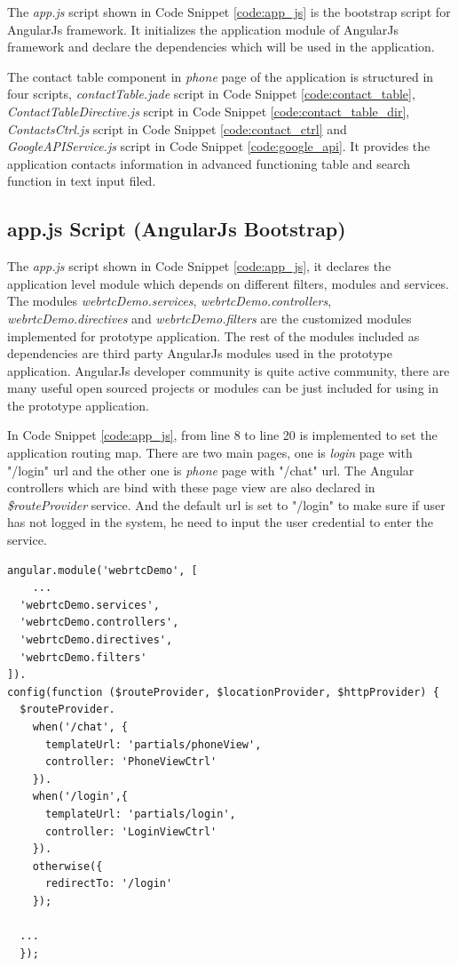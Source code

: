 \par The \textit{app.js} script shown in Code Snippet \ref{code:app_js} is the bootstrap script for AngularJs framework. It initializes the application module of AngularJs framework and declare the dependencies which will be used in the application.

\par The contact table component in \textit{phone} page of the application is structured in four scripts, \textit{contactTable.jade} script in Code Snippet \ref{code:contact_table}, \textit{ContactTableDirective.js} script in Code Snippet \ref{code:contact_table_dir}, \textit{ContactsCtrl.js} script in Code Snippet \ref{code:contact_ctrl} and \textit{GoogleAPIService.js} script in Code Snippet \ref{code:google_api}. It provides the application contacts information in advanced functioning table and search function in text input filed.

\subsection{app.js Script (AngularJs Bootstrap)}

\par The \textit{app.js} script shown in Code Snippet \ref{code:app_js}, it declares the application level module which depends on different filters, modules and services. The modules \textit{webrtcDemo.services}, \textit{webrtcDemo.controllers}, \textit{webrtcDemo.directives} and \textit{webrtcDemo.filters} are the customized modules implemented for prototype application. The rest of the modules included as dependencies are third party AngularJs modules used in the prototype application. AngularJs developer community is quite active community, there are many useful open sourced projects or modules can be just included for using in the prototype application.

\par In Code Snippet \ref{code:app_js}, from line 8 to line 20 is implemented to set the application routing map. There are two main pages, one is \textit{login} page with "/login" \gls{url} and the other one is \textit{phone} page with "/chat" \gls{url}. The Angular controllers which are bind with these page view are also declared in \textit{\$routeProvider} service. And the default \gls{url} is set to "/login" to make sure if user has not logged in the system, he need to input the user credential to enter the service. 

\label{app:app_js}
\begin{lstlisting}[caption={app.js in application client},label={code:app_js}]
angular.module('webrtcDemo', [
    ...
  'webrtcDemo.services',
  'webrtcDemo.controllers',
  'webrtcDemo.directives',
  'webrtcDemo.filters'
]).
config(function ($routeProvider, $locationProvider, $httpProvider) {
  $routeProvider.
    when('/chat', {
      templateUrl: 'partials/phoneView',
      controller: 'PhoneViewCtrl'
    }).
    when('/login',{
      templateUrl: 'partials/login',
      controller: 'LoginViewCtrl'
    }).
    otherwise({
      redirectTo: '/login'
    });

  ...
  });

\end{lstlisting}

